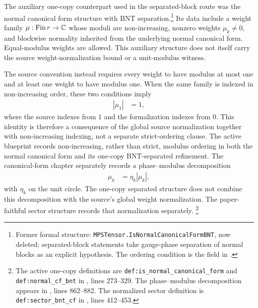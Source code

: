 \documentclass{article}
\begin{document}
The auxiliary one-copy counterpart used in the separated-block route was the
normal canonical form structure with BNT separation.\footnote{%
    Former formal structure: \texttt{MPSTensor.IsNormalCanonicalFormBNT}, now
    deleted; separated-block statements take gauge-phase separation of normal
    blocks as an explicit hypothesis. The ordering condition is the field
     in
    .}
Its data include a weight family $\mu:\mathrm{Fin}\,r\to\mathbb{C}$ whose moduli are
non-increasing, nonzero weights $\mu_k\neq 0$, and blockwise normality inherited
from the underlying normal canonical form. Equal-modulus weights are allowed.
This auxiliary structure does not itself carry the source weight-normalization
bound or a unit-modulus witness.

The source convention instead requires every weight to have modulus at most
one and at least one weight to have modulus one. When the same family is indexed
in non-increasing order, these two conditions imply
\begin{align}
    |\mu_1|
        &= 1,
    \label{eq:cpsv16_cf_normalization_and_proportional_comparison_missing_dominant_normalization}
\end{align}
where the source indexes from $1$ and the formalization indexes from $0$. This
identity is therefore a consequence of the global source normalization together
with non-increasing indexing, not a separate strict-ordering clause.
The active blueprint records non-increasing, rather than strict, modulus
ordering in both the normal canonical form and its one-copy BNT-separated
refinement. The canonical-form chapter separately records a phase--modulus
decomposition
\begin{align}
    \mu_k
        &= \eta_k|\mu_k|,
    \label{eq:cpsv16_cf_normalization_and_proportional_comparison_phase_modulus_decomposition}
\end{align}
with $\eta_k$ on the unit circle. The one-copy separated structure does not
combine this decomposition with the source's global weight normalization.
The paper-faithful sector structure records that normalization separately.
\footnote{%
    The active one-copy definitions are \texttt{def:is\_normal\_canonical\_form}
    and \texttt{def:normal\_cf\_bnt} in
    ,
    lines 273--329. The phase--modulus decomposition appears in
    ,
    lines 862--882. The normalized sector definition is
    \texttt{def:sector\_bnt\_cf} in
    ,
    lines 412--453.}
\end{document}

